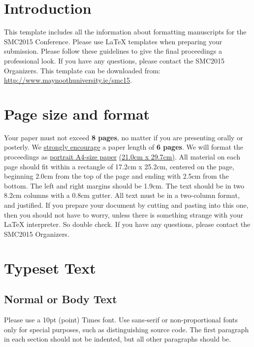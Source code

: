 \documentclass{article}
\title{\papertitle}
\begin{document}
%
\capstartfalse
\maketitle
\capstarttrue
%
\begin{abstract}
Place your abstract at the top left column on the first page.
Please write about 150-200 words that specifically highlight the purpose of your work,
its context, and provide a brief synopsis of your results.
Avoid equations in this part.
\end{abstract}
%

\section{Introduction}\label{sec:introduction}
This template includes all the information about formatting manuscripts for
the SMC2015 Conference.
Please use \LaTeX{} templates when
preparing your submission.
Please follow these guidelines to give the final proceedings a professional look.
If you have any questions, please contact the SMC2015 Organizers.
This template can be downloaded from:
\url{http://www.maynoothuniversity.ie/smc15}.

\section{Page size and format}\label{sec:page_size}
Your paper must not exceed {\bf 8 pages},
no matter if you are presenting orally or posterly.
We \underline{strongly encourage}
a paper length of {\bf 6 pages}.
We will format the proceedings as
 \underline{portrait A4-size paper} \underline{(21.0cm x 29.7cm)}.
All material on each page should fit within a rectangle of 17.2cm x 25.2cm,
centered on the page, beginning 2.0cm from the top of the page and ending
with 2.5cm from the bottom.
The left and right margins should be 1.9cm.
The text should be in two 8.2cm columns with a 0.8cm gutter.
All text must be in a two-column format, and justified.
If you prepare your document by cutting and pasting into this one,
then you should not have to worry,
unless there is something strange with your \LaTeX{} interpreter.
So double check.
If you have any questions, please contact the SMC2015 Organizers.

\section{Typeset Text}\label{sec:typeset_text}

\subsection{Normal or Body Text}\label{subsec:body}
Please use a 10pt (point) Times font.
Use sans-serif or non-proportional fonts
only for special purposes,
such as distinguishing source code.
The first paragraph in each section should not be indented,
but all other paragraphs should be.
\end{document}
